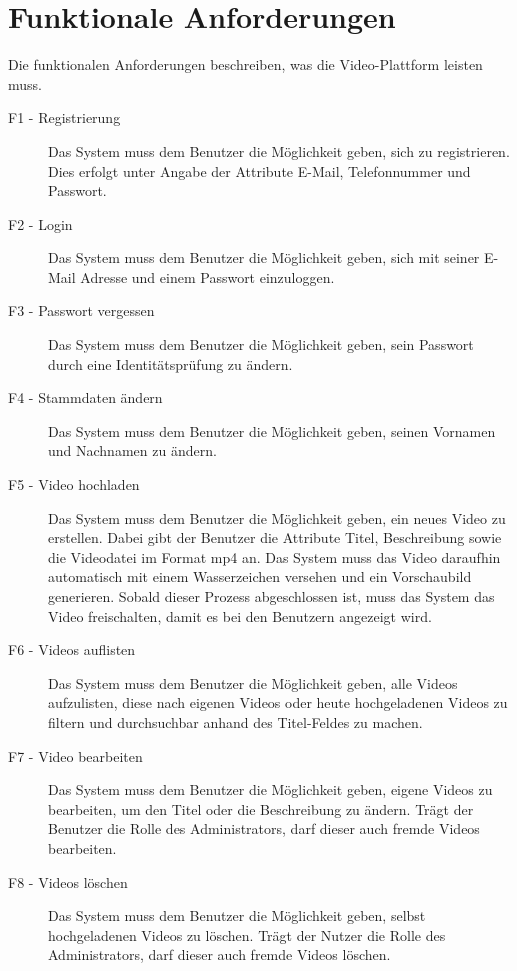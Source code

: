 \section{Funktionale Anforderungen}

Die funktionalen Anforderungen beschreiben, was die Video-Plattform leisten muss.

\begin{description}
   \item[F1 - Registrierung] Das System muss dem Benutzer die Möglichkeit geben, sich zu registrieren. Dies erfolgt unter Angabe der Attribute E-Mail, Telefonnummer und Passwort.
   \item[F2 - Login] Das System muss dem Benutzer die Möglichkeit geben, sich mit seiner E-Mail Adresse und einem Passwort einzuloggen.
   \item[F3 - Passwort vergessen] Das System muss dem Benutzer die Möglichkeit geben, sein Passwort durch eine Identitätsprüfung zu ändern.
   \item[F4 - Stammdaten ändern] Das System muss dem Benutzer die Möglichkeit geben, seinen Vornamen und Nachnamen zu ändern.
   \item[F5 - Video hochladen] Das System muss dem Benutzer die Möglichkeit geben, ein neues Video zu erstellen. Dabei gibt der Benutzer die Attribute Titel, Beschreibung sowie die Videodatei im Format mp4 an. Das System muss das Video daraufhin automatisch mit einem Wasserzeichen versehen und ein Vorschaubild generieren. Sobald dieser Prozess abgeschlossen ist, muss das System das Video freischalten, damit es bei den Benutzern angezeigt wird.
   \item[F6 - Videos auflisten] Das System muss dem Benutzer die Möglichkeit geben, alle Videos aufzulisten, diese nach eigenen Videos oder heute hochgeladenen Videos zu filtern und durchsuchbar anhand des Titel-Feldes zu machen.
   \item[F7 - Video bearbeiten] Das System muss dem Benutzer die Möglichkeit geben, eigene Videos zu bearbeiten, um den Titel oder die Beschreibung zu ändern. Trägt der Benutzer die Rolle des Administrators, darf dieser auch fremde Videos bearbeiten.
   \item[F8 - Videos löschen] Das System muss dem Benutzer die Möglichkeit geben, selbst hochgeladenen Videos zu löschen. Trägt der Nutzer die Rolle des Administrators, darf dieser auch fremde Videos löschen.
\end{description}